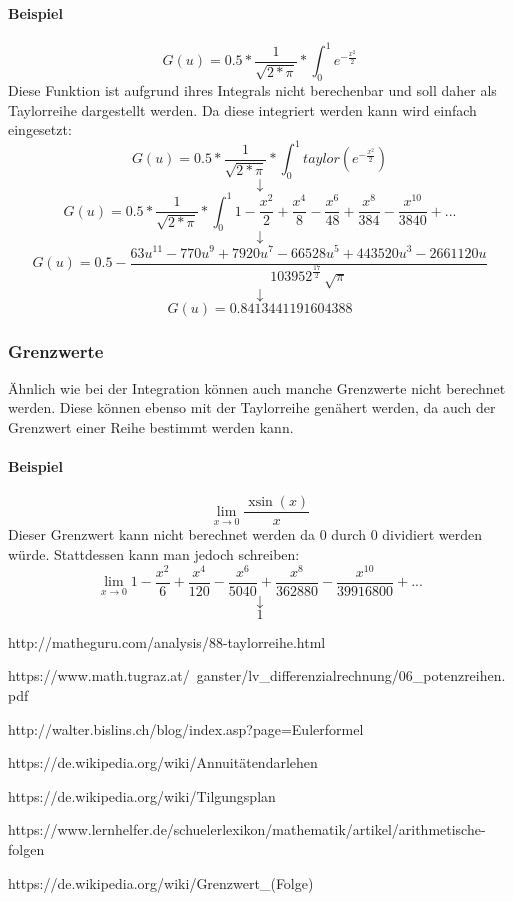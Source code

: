 \documentclass{school}
\begin{document}
\paragraph{Beispiel}
$$G(u) = 0.5 * \frac{1}{\sqrt{2*\pi}}*\int_0^1 e^{- \frac{x^2}{2}}$$
Diese Funktion ist aufgrund ihres Integrals nicht berechenbar und soll daher als Taylorreihe dargestellt werden.
Da diese integriert werden kann wird einfach eingesetzt:
$$G(u) = 0.5 * \frac{1}{\sqrt{2*\pi}}*\int_0^1 taylor(e^{- \frac{x^2}{2}})$$
$$\downarrow$$
$$G(u) = 0.5 * \frac{1}{\sqrt{2*\pi}}*\int_0^1 1-\frac{{{x}^{2}}}{2}+\frac{{{x}^{4}}}{8}-\frac{{{x}^{6}}}{48}+\frac{{{x}^{8}}}{384}-\frac{{{x}^{10}}}{3840}+\mbox{...}$$
$$\downarrow$$
\[G(u) = 0.5-\frac{63 {{u}^{11}}-770 {{u}^{9}}+7920 {{u}^{7}}-66528 {{u}^{5}}+443520 {{u}^{3}}-2661120 u}{10395 {{2}^{\frac{17}{2}}}\, \sqrt{\ensuremath{\pi} }}\]
$$\downarrow$$
$$G(u) = 0.8413441191604388$$

\newpage

\subsubsection{Grenzwerte}
\"Ahnlich wie bei der Integration k\"onnen auch manche Grenzwerte nicht berechnet werden.
Diese k\"onnen ebenso mit der Taylorreihe gen\"ahert werden, da auch der Grenzwert einer Reihe bestimmt werden kann.

\paragraph{Beispiel}
\[\lim_{x\to0}{\frac{\operatorname{xsin}(x)}{x}}\]
Dieser Grenzwert kann nicht berechnet werden da 0 durch 0 dividiert werden w\"urde. Stattdessen kann man jedoch schreiben:
$$\lim_{x\to0} 1-\frac{{{x}^{2}}}{6}+\frac{{{x}^{4}}}{120}-\frac{{{x}^{6}}}{5040}+\frac{{{x}^{8}}}{362880}-\frac{{{x}^{10}}}{39916800}+\text{...}$$
$$\downarrow$$
$$1$$

\printglossaries

\begin{thebibliography}{1}

 http://matheguru.com/analysis/88-taylorreihe.html

 https://www.math.tugraz.at/~ganster/lv\_differenzialrechnung/06\_potenzreihen.pdf

 http://walter.bislins.ch/blog/index.asp?page=Eulerformel

 https://de.wikipedia.org/wiki/Annuitätendarlehen

 https://de.wikipedia.org/wiki/Tilgungsplan

 https://www.lernhelfer.de/schuelerlexikon/mathematik/artikel/arithmetische-folgen

 https://de.wikipedia.org/wiki/Grenzwert\_(Folge)

\end{thebibliography}

\listoffigures
\end{document}
